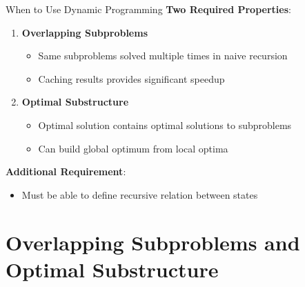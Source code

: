 \documentclass[aspectratio=169]{beamer}
\begin{document}
\begin{frame}{When to Use Dynamic Programming}
  \textbf{Two Required Properties}:

  \vspace{0.3cm}

  \begin{enumerate}
    \item \textbf{Overlapping Subproblems}
    \begin{itemize}
      \item Same subproblems solved multiple times in naive recursion
      \item Caching results provides significant speedup
    \end{itemize}

    \vspace{0.3cm}

    \item \textbf{Optimal Substructure}
    \begin{itemize}
      \item Optimal solution contains optimal solutions to subproblems
      \item Can build global optimum from local optima
    \end{itemize}
  \end{enumerate}

  \vspace{0.5cm}

  \textbf{Additional Requirement}:
  \begin{itemize}
    \item Must be able to define recursive relation between states
  \end{itemize}
\end{frame}

\section{Overlapping Subproblems and Optimal Substructure}
\end{document}
